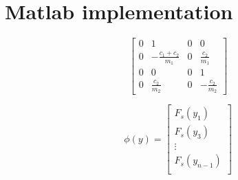 \section{Matlab implementation}

\[
\begin{bmatrix}
    0 & 1 & 0 & 0 \\
    0 & -\frac{c_1+c_2}{m_1} & 0 & \frac{c_2}{m_1} \\
    0 & 0 & 0 & 1 \\
    0 & \frac{c_2}{m_2} & 0 & -\frac{c_2}{m_2}
\end{bmatrix}
\]

\[
\phi(y) =
\begin{bmatrix}
    F_s(y_{1}) \\ F_s(y_3) \\ \vdots \\ F_s(y_{n-1}) \\
\end{bmatrix}
\]